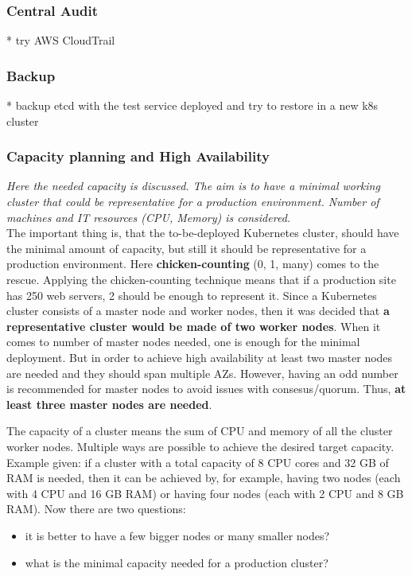 \subsubsection{Central Audit}

* try AWS CloudTrail

\subsubsection{Backup}

* backup etcd with the test service deployed and try to restore in a new k8s cluster


\subsubsection{Capacity planning and High Availability}
\textit{Here the needed capacity is discussed. The aim is to have a minimal working cluster that could be representative for a production environment. Number of machines and IT resources (CPU, Memory) is considered.}
\\

The important thing is, that the to-be-deployed Kubernetes cluster, should have the minimal amount of capacity, but still it should be representative for a production environment. Here \textbf{chicken-counting} (0, 1, many) comes to the rescue. Applying the chicken-counting technique means that if a production site has 250 web servers, 2 should be enough to represent it\cite{book-cicd}. Since a Kubernetes cluster consists of a master node and worker nodes, then it was decided that \textbf{a representative cluster would be made of two worker nodes}. When it comes to number of master nodes needed, one is enough for the minimal deployment. But in order to achieve high availability at least two master nodes are needed and they should span multiple AZs\cite{article-aws-architecting}. However, having an odd number is recommended for master nodes to avoid issues with consesus/quorum. Thus, \textbf{at least three master nodes are needed}\cite{online-ha-k8s-blog}.

The capacity of a cluster means the sum of CPU and memory of all the cluster worker nodes. Multiple ways are possible to achieve the desired target capacity. Example given: if a cluster with a total capacity of 8 CPU cores and 32 GB of RAM is needed, then it can be achieved by, for example, having two nodes (each with 4 CPU and 16 GB RAM) or having four nodes (each with 2 CPU and 8 GB RAM)\cite{kubernetes-node-size}. Now there are two questions:
\begin{itemize}
\item it is better to have a few bigger nodes or many smaller nodes?
\item what is the minimal capacity needed for a production cluster?
\end{itemize}

